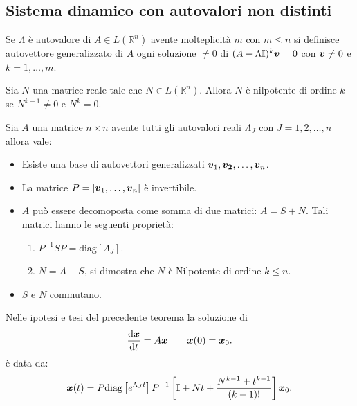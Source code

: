 \subsection{Sistema dinamico con autovalori non distinti}%
\label{sub:Sistema dinamico con autovalori non distinti}
\begin{defn}
    Se  $\Lambda$ è autovalore di $A\in L(\mathbb{R}^n)$ avente molteplicità $m$ con $m\le n$ si definisce autovettore generalizzato di $A$ ogni soluzione $\neq 0$ di $(A-\Lambda\mathbb{I})^k \boldsymbol{v} = 0$ con $\boldsymbol{v}\neq 0$ e $k = 1, \ldots, m$.
\end{defn}
\noindent
\begin{defn}
    Sia $N$ una matrice reale tale che $N\in L(\mathbb{R}^n)$. Allora $N$ è nilpotente di ordine $k$ se $N^{k-1}\neq 0$ e $N^k = 0$.
\end{defn}
\noindent
\begin{thm}
Sia $A$ una matrice $n\times n$ avente tutti gli autovalori reali $\Lambda_J$ con $J = 1, 2, \ldots, n$ allora vale:
\begin{itemize}
    \item Esiste una base di autovettori generalizzati $\boldsymbol{v}_1, \boldsymbol{v_2}, \ldots, \boldsymbol{v}_n$.
    \item La matrice $P=\left[\boldsymbol{v}_1, \ldots, \boldsymbol{v}_n\right]$ è invertibile.
    \item $A$ può essere decomoposta come somma di due matrici: $A = S + N$. Tali matrici hanno le seguenti proprietà:
	\begin{enumerate}
	    \item $P^{-1}SP = \text{diag}\left[\Lambda_J\right]$.
	    \item $N = A-S$, si dimostra che $N$ è Nilpotente di ordine $k\le n$.
	\end{enumerate}
    \item $S$ e $N$ commutano.
\end{itemize}
\end{thm}
\noindent
\begin{thm}
    Nelle ipotesi e tesi del precedente teorema la soluzione di 
    \[
	\frac{\text{d} \boldsymbol{x}}{\text{d} t} = A \boldsymbol{x} \qquad \boldsymbol{x}(0) = \boldsymbol{x}_0 
    .\] 
    è data da: 
    \[
	\boldsymbol{x}(t) = P \text{diag}\left[e^{\Lambda_Jt}\right]P^{-1}\left[\mathbb{I} + Nt + \frac{N^{k-1} + t^{k-1}}{(k-1) !}\right]\boldsymbol{x}_0
    .\] 
\end{thm}
\noindent
